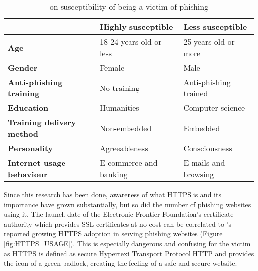 \begin{table}[b]
	\begin{center}
		\begin{tabular}{ | m{12em} | m{12em} | m{11.5em} | }
			\hline
			                                  & \textbf{Highly susceptible} & \textbf{Less susceptible} \\
			\hline
			\textbf{Age}                      & 18-24 years old or less     & 25 years old or more      \\
			\hline

			\textbf{Gender}                   & Female                      & Male                      \\
			\hline

			\textbf{Anti-phishing training}   & No training                 & Anti-phishing trained     \\
			\hline

			\textbf{Education}                & Humanities                  & Computer science          \\
			\hline

			\textbf{Training delivery method} & Non-embedded                & Embedded                  \\
			\hline

			\textbf{Personality}              & Agreeableness               & Consciousness             \\
			\hline

			\textbf{Internet usage behaviour} & E-commerce and banking      & E-mails and browsing      \\
			\hline
		\end{tabular}
		\caption{\cite{Darwish} on susceptibility of being a victim of phishing}
		\label{tab:SUSCEPTIBILITY_BREAKDOWN}
	\end{center}
\end{table}

Since this research has been done, awareness of what \gls{HTTPS} is and its importance have grown substantially, but so did the number of phishing websites using it. The launch date of the Electronic Frontier Foundation's \citep{EFF} certificate authority which provides \gls{SSL} certificates at no cost can be correlated to \cite{APWG_Q42019}'s reported growing HTTPS adoption in serving phishing websites (Figure \ref{fig:HTTPS_USAGE}). This is especially dangerous and confusing for the victim as \gls{HTTPS} is defined as secure Hypertext Transport Protocol \gls{HTTP} and provides the icon of a green padlock, creating the feeling of a safe and secure website.

